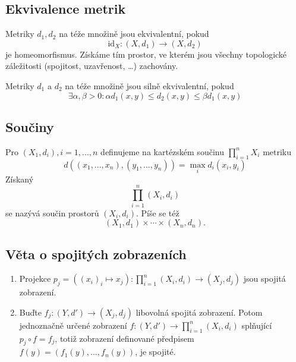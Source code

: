 \documentclass[../main.tex]{subfiles}
\begin{document}
\subsection{Ekvivalence metrik}

\begin{definition}
	Metriky $d_1, d_2$ na téže množině jsou ekvivalentní, pokud $$\mathrm{id}_X : \left(X, d_1\right) \to (X, d_2)$$ je homeomorfismus. Získáme tím prostor, ve kterém jsou všechny topologické záležitosti (spojitost, uzavřenost, \ldots) zachovány.
\end{definition}


\begin{definition}
	Metriky $d_1$ a $d_2$ na téže množině jsou silně ekvivalentní, pokud
	\[\exists \alpha , \beta > 0: \alpha d_1(x,y) \leq d_2(x,y) \leq \beta d_1(x,y)\]
\end{definition}

\subsection{Součiny}

\begin{definition}[Součin]
	Pro $(X_1,d_i), i = 1,...,n$ definujeme na kartézském součinu $\prod^n_{i=1}X_i$ metriku
	\[d((x_1,...,x_n),(y_1,...,y_n)) = \max_i d_i(x_i,y_i)\]
	Získaný
	\[\prod^n_{i=1}(X_i,d_i)\]
	se nazývá součin prostorů $(X_i, d_i)$. Píše se též 
	\[(X_1,d_1) \times \cdots \times (X_n,d_n).\]
\end{definition}

\subsection{Věta o spojitých zobrazeních}
\begin{theorem}
	\hfill
	\begin{enumerate}
	\item Projekce $p_j = ((x_i)_i \mapsto x_j) : \prod^n_{i=1}(X_i,d_i) \rightarrow (X_j,d_j)$ jsou spojitá zobrazení.
	
	\item Buďte $f_j:(Y,d') \rightarrow (X_j,d_j)$ libovolná spojitá zobrazení. Potom jednoznačně určené zobrazení 
	$f:(Y,d') \rightarrow \prod^n_{i=1}(X_i,d_i)$ splňující $p_j \circ f = f_j$, totiž zobrazení definované předpisem
	$f(y) = (f_1(y),...,f_n(y))$, je spojité.
	\end{enumerate}
\end{theorem}
\end{document}
